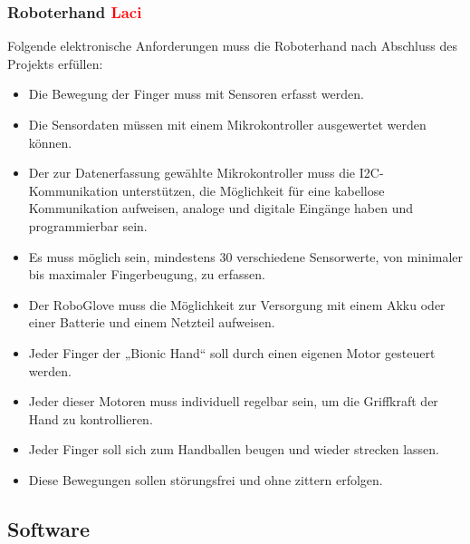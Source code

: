 \documentclass[11pt]{article}
\begin{document}
\subsubsection{Roboterhand \textcolor{red}{Laci}}
Folgende elektronische Anforderungen muss die Roboterhand nach Abschluss des Projekts erfüllen:

	\begin{itemize}
		\item Die Bewegung der Finger muss mit Sensoren erfasst werden.
		\item Die Sensordaten müssen mit einem Mikrokontroller ausgewertet werden können.
		\item Der zur Datenerfassung gewählte Mikrokontroller muss die I2C-Kommunikation unterstützen, die Möglichkeit
			  für eine kabellose Kommunikation aufweisen, analoge und digitale Eingänge haben und programmierbar sein. 
		\item Es muss möglich sein, mindestens 30 verschiedene Sensorwerte, von minimaler bis maximaler Fingerbeugung, 
		      zu erfassen.
		\item Der RoboGlove muss die Möglichkeit zur Versorgung mit einem Akku oder einer Batterie und einem Netzteil 
		      aufweisen. 
		\item Jeder Finger der „Bionic Hand“ soll durch einen eigenen Motor gesteuert werden.
		\item Jeder dieser Motoren muss individuell regelbar sein, um die Griffkraft der Hand zu kontrollieren.	
		\item Jeder Finger soll sich zum Handballen beugen und wieder strecken lassen.	
		\item Diese Bewegungen sollen störungsfrei und ohne zittern erfolgen.
	\end{itemize}

\subsection{Software}
\end{document}
